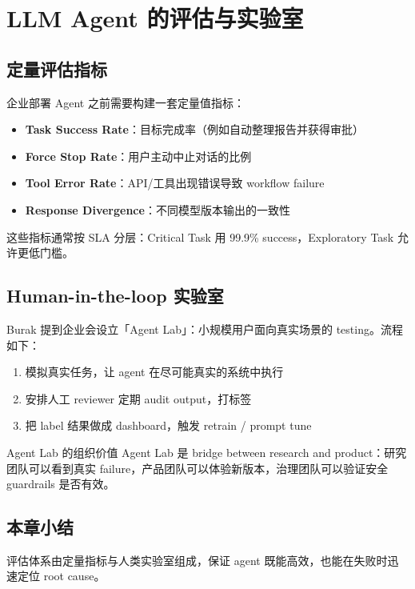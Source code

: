 \section{LLM Agent 的评估与实验室}

\subsection{定量评估指标}

企业部署 Agent 之前需要构建一套定量值指标：

\begin{itemize}
    \item \textbf{Task Success Rate}：目标完成率（例如自动整理报告并获得审批）
    \item \textbf{Force Stop Rate}：用户主动中止对话的比例
    \item \textbf{Tool Error Rate}：API/工具出现错误导致 workflow failure
    \item \textbf{Response Divergence}：不同模型版本输出的一致性
\end{itemize}

这些指标通常按 SLA 分层：Critical Task 用 99.9\% success，Exploratory Task 允许更低门槛。

\subsection{Human-in-the-loop 实验室}

Burak 提到企业会设立「Agent Lab」：小规模用户面向真实场景的 testing。流程如下：

\begin{enumerate}
    \item 模拟真实任务，让 agent 在尽可能真实的系统中执行
    \item 安排人工 reviewer 定期 audit output，打标签
    \item 把 label 结果做成 dashboard，触发 retrain / prompt tune
\end{enumerate}

\begin{knowledgebox}{Agent Lab 的组织价值}
Agent Lab 是 bridge between research and product：研究团队可以看到真实 failure，产品团队可以体验新版本，治理团队可以验证安全 guardrails 是否有效。
\end{knowledgebox}

\subsection{本章小结}

评估体系由定量指标与人类实验室组成，保证 agent 既能高效，也能在失败时迅速定位 root cause。

